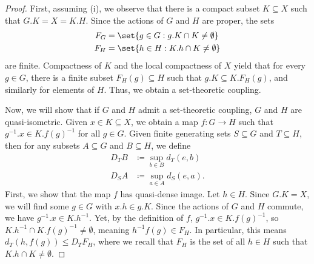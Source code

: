 \documentclass[10pt]{mypackage}
\renewcommand{\coloneq}{\coloneqq}
\begin{document}
\begin{proof}
  First, assuming (i), we observe that there is a compact subset $K\subseteq X$ such that $G.K = X = K.H$. Since the actions of $G$ and $H$ are proper, the sets
  \begin{align*}
    F_G &= \set{g\in G : g.K\cap K \neq \emptyset}\\
    F_H &= \set{h\in H : K.h\cap K\neq \emptyset}
  \end{align*}
  are finite. Compactness of $K$ and the local compactness of $X$ yield that for every $g\in G$, there is a finite subset $F_H(g)\subseteq H$ such that $g.K\subseteq K.F_H(g)$, and similarly for elements of $H$. Thus, we obtain a set-theoretic coupling.

  Now, we will show that if $G$ and $H$ admit a set-theoretic coupling, $G$ and $H$ are quasi-isometric. Given $x\in K\subseteq X$, we obtain a map $f\colon G\rightarrow H$ such that $g^{-1}.x \in K.f(g)^{-1}$ for all $g\in G$. Given finite generating sets $S\subseteq G$ and $T\subseteq H$, then for any subsets $A\subseteq G$ and $B\subseteq H$, we define
  \begin{align*}
    D_TB &\coloneq \sup_{b\in B} d_T(e,b)\\
    D_SA &\coloneq \sup_{a\in A} d_S(e,a).
  \end{align*}
  First, we show that the map $f$ has quasi-dense image. Let $h\in H$. Since $G.K = X$, we will find some $g\in G$ with $x.h\in g.K$. Since the actions of $G$ and $H$ commute, we have $g^{-1}.x\in K.h^{-1}$. Yet, by the definition of $f$, $g^{-1}.x\in K.f(g)^{-1}$, so $K.h^{-1}\cap K.f(g)^{-1}\neq \emptyset$, meaning $h^{-1}f(g)\in F_H$. In particular, this means $d_T\left( h,f(g) \right)\leq D_TF_H$, where we recall that $F_H$ is the set of all $h\in H$ such that $K.h\cap K\neq \emptyset$.


\end{proof}
\end{document}
